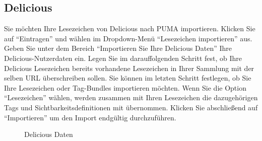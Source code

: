 \subsection{Delicious}
\label{subsec:delicious}
Sie möchten Ihre Lesezeichen von Delicious nach PUMA importieren. Klicken Sie auf \enquote{Eintragen} und wählen im Dropdown-Menü \enquote{Lesezeichen importieren} aus. Geben Sie unter dem Bereich \enquote{Importieren Sie Ihre Delicious Daten} Ihre Delicious-Nutzerdaten ein. \newline
Legen Sie im darauffolgenden Schritt fest, ob Ihre Delicious Lesezeichen bereits vorhandene Lesezeichen in Ihrer Sammlung mit der selben URL überschreiben sollen.\newline
Sie können im letzten Schritt festlegen, ob Sie Ihre Lesezeichen oder Tag-Bundles importieren möchten. Wenn Sie die Option \enquote{Lesezeichen} wählen, werden zusammen mit Ihren Lesezeichen die dazugehörigen Tags und Sichtbarkeitsdefinitionen mit übernommen.
\newline Klicken Sie abschließend auf \enquote{Importieren} um den Import endgültig durchzuführen.
\begin{figure}[h!]
 \centering
 \caption{Delicious Daten}
 \label{fig:deliciousDaten}
\end{figure} 

